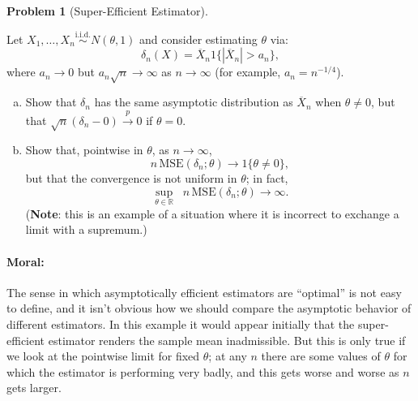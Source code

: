 \documentclass{article}
\newcommand{\RR}{\mathbb{R}}
\newcommand{\toProb}{\overset{p}{\to}}
\newcommand{\simiid}{\overset{\text{i.i.d.}}{\sim}}
\theoremstyle{definition}
\newtheorem{problem}{Problem}
\begin{document}
\begin{problem}[Super-Efficient Estimator]
\label{prob:super-efficiency}

Let $X_1,\ldots,X_n \simiid N(\theta,1)$ and consider estimating $\theta$ via:
\[
\delta_n(X) = \overline{X}_n 1\{|\overline{X}_n| > a_n\},
\]
where $a_n \to 0$ but $a_n\sqrt{n} \to \infty$ as $n \to \infty$ (for example, $a_n = n^{-1/4}$).

\begin{enumerate}[(a)]
\item Show that $\delta_n$ has the same asymptotic distribution as $\overline X_n$ when $\theta \neq 0$, but that $\sqrt{n}(\delta_n-0)\toProb 0$ if $\theta = 0$.



\item Show that, pointwise in $\theta$, as $n\to\infty$,
\[
n\,\text{MSE}(\delta_n;\theta) \to 1\{\theta\neq 0\},
\]
but that the convergence is not uniform in $\theta$; in fact,
\[
\sup_{\theta\in\RR}\;\; n\,\text{MSE}(\delta_n;\theta) \rightarrow \infty.
\]
({\bf Note}: this is an example of a situation where it is incorrect to exchange a limit with a supremum.)



\end{enumerate}

\paragraph{Moral:} The sense in which asymptotically efficient estimators are ``optimal'' is not easy to define, and it isn't obvious how we should compare the asymptotic behavior of different estimators. In this example it would appear initially that the super-efficient estimator renders the sample mean inadmissible. But this is only true if we look at the pointwise limit for fixed $\theta$; at any $n$ there are some values of $\theta$ for which the estimator is performing very badly, and this gets worse and worse as $n$ gets larger.

\end{problem}





\end{document}
